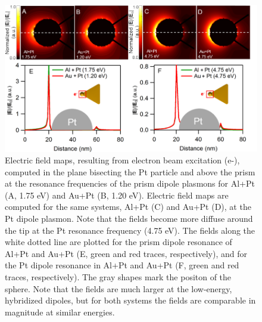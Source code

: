 \documentclass [11pt, proquest] {uwthesis}[2016/11/22]
\begin{document}
\begin{figure}
\begin{centering}
\includegraphics{prisms_field_calculations.png}
\caption{Electric field maps, resulting from electron beam excitation (e-), computed in the plane bisecting the Pt particle and above the prism at the resonance frequencies of the prism dipole plasmons for Al+Pt (A, 1.75 eV) and Au+Pt (B, 1.20 eV). Electric field maps are computed for the same systems, Al+Pt (C) and Au+Pt (D), at the Pt dipole plasmon. Note that the fields become more diffuse around the tip at the Pt resonance frequency (4.75 eV). The fields along the white dotted line are plotted for the prism dipole resonance of Al+Pt and Au+Pt (E, green and red traces, respectively), and for the Pt dipole resonance in Al+Pt and Au+Pt (F, green and red traces, respectively). The gray shapes mark the positon of the sphere. Note that the fields are much larger at the low-energy, hybridized dipoles, but for both systems the fields are comparable in magnitude at similar energies.}
\label{field_top}
\end{centering}
\end{figure}
\end{document}

